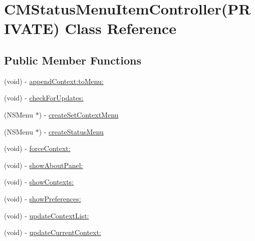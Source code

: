 \hypertarget{interface_c_m_status_menu_item_controller_07_p_r_i_v_a_t_e_08}{
\section{CMStatusMenuItemController(PRIVATE) Class Reference}
\label{interface_c_m_status_menu_item_controller_07_p_r_i_v_a_t_e_08}
}
\subsection*{Public Member Functions}
\begin{CompactItemize}
\item 
(void) - \hyperlink{interface_c_m_status_menu_item_controller_07_p_r_i_v_a_t_e_08_ec28a24654abc7d6a529a2d4b45c3be0}{appendContext:toMenu:}
\item 
(void) - \hyperlink{interface_c_m_status_menu_item_controller_07_p_r_i_v_a_t_e_08_e4fe07dbdd8724b2af66b45938717e53}{checkForUpdates:}
\item 
(NSMenu $\ast$) - \hyperlink{interface_c_m_status_menu_item_controller_07_p_r_i_v_a_t_e_08_4a5ace91e09afc8737c665434301f52f}{createSetContextMenu}
\item 
(NSMenu $\ast$) - \hyperlink{interface_c_m_status_menu_item_controller_07_p_r_i_v_a_t_e_08_cb8323811e85b2b5a3ee4a1ee49b2c34}{createStatusMenu}
\item 
(void) - \hyperlink{interface_c_m_status_menu_item_controller_07_p_r_i_v_a_t_e_08_8534e39df7673a839ed8ac9d2421d065}{forceContext:}
\item 
(void) - \hyperlink{interface_c_m_status_menu_item_controller_07_p_r_i_v_a_t_e_08_42dd0164edf069dcfa4cc1fb1961ddfb}{showAboutPanel:}
\item 
(void) - \hyperlink{interface_c_m_status_menu_item_controller_07_p_r_i_v_a_t_e_08_51b8931792a7dcfef977dfd9e0d4d62c}{showContexts:}
\item 
(void) - \hyperlink{interface_c_m_status_menu_item_controller_07_p_r_i_v_a_t_e_08_e7e1a5e5777596a1344f0dc3f59e153f}{showPreferences:}
\item 
(void) - \hyperlink{interface_c_m_status_menu_item_controller_07_p_r_i_v_a_t_e_08_e782d8e2f6c8a7a6f946f3252c18c9f3}{updateContextList:}
\item 
(void) - \hyperlink{interface_c_m_status_menu_item_controller_07_p_r_i_v_a_t_e_08_7e84d9910082dad2325514a73e3ef728}{updateCurrentContext:}
\end{CompactItemize}


